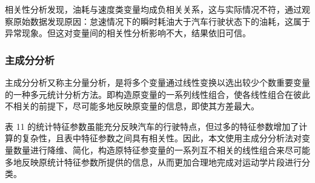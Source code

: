 \documentclass[bwprint]{gmcmthesis}
\begin{document}
相关性分析发现，油耗与速度类变量均成负相关关系，这与实际情况不符，通过观察原始数据发现原因：怠速情况下的瞬时耗油大于汽车行驶状态下的油耗，这属于异常现象。但这对变量间的相关性分析影响不大，结果依旧可信。

\subsubsection{主成分分析}
主成分分析又称主分量分析，是将多个变量通过线性变换以选出较少个数重要变量的一种多元统计分析方法。即构造原变量的一系列线性组合，使各线性组合在彼此不相关的前提下，尽可能多地反映原变量的信息，即使其方差最大\cite{c3}。

表 11 的统计特征参数虽能充分反映汽车的行驶特点，但过多的特征参数增加了计算的复杂性，且表中特征参数之间具有相关性。因此，本文使用主成分分析法对变量数量进行降维、简化，构造原特征参变量的一系列互不相关的线性组合来尽可能多地反映原统计特征参数所提供的信息，从而更加合理地完成对运动学片段进行分类。
\end{document}
